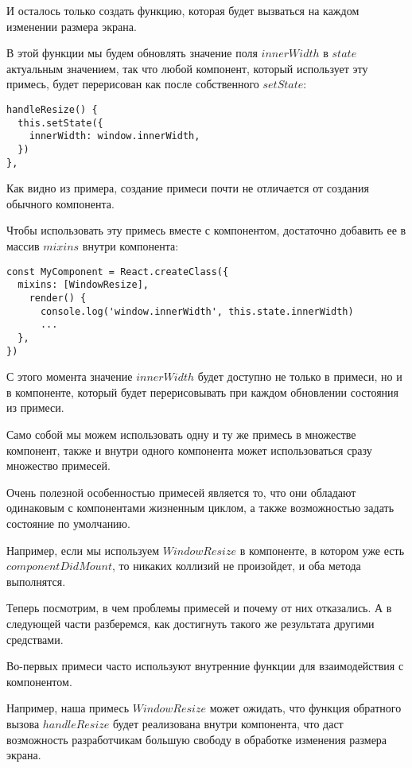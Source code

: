 И осталось только создать функцию, которая будет вызваться на каждом изменении размера экрана.

В этой функции мы будем обновлять значение поля $innerWidth$ в $state$ актуальным значением, так что любой компонент, который использует эту примесь, будет перерисован как после собственного $setState$:

\begin{lstlisting}
handleResize() {
  this.setState({
    innerWidth: window.innerWidth,
  })
},
\end{lstlisting}

Как видно из примера, создание примеси почти не отличается от создания обычного компонента.

Чтобы использовать эту примесь вместе с компонентом, достаточно добавить ее в массив $mixins$ внутри компонента:

\begin{lstlisting}
const MyComponent = React.createClass({
  mixins: [WindowResize],
    render() {
      console.log('window.innerWidth', this.state.innerWidth)
      ...
  }, 
})
\end{lstlisting}

С этого момента значение $innerWidth$ будет доступно не только в примеси, но и в компоненте, который будет перерисовывать при каждом обновлении состояния из примеси.

Само собой мы можем использовать одну и ту же примесь в множестве компонент, также и внутри одного компонента может использоваться сразу множество примесей.

Очень полезной особенностью примесей является то, что они обладают одинаковым с компонентами жизненным циклом, а также возможностью задать состояние по умолчанию.

Например, если мы используем $WindowResize$ в компоненте, в котором уже есть $componentDidMount$, то никаких коллизий не произойдет, и оба метода выполнятся.

Теперь посмотрим, в чем проблемы примесей и почему от них отказались. А в следующей части разберемся, как достигнуть такого же результата другими средствами.

Во-первых примеси часто используют внутренние функции для взаимодействия с компонентом.

Например, наша примесь $WindowResize$ может ожидать, что функция обратного вызова $handleResize$ будет реализована внутри компонента, что даст возможность разработчикам большую свободу в обработке изменения размера экрана.

